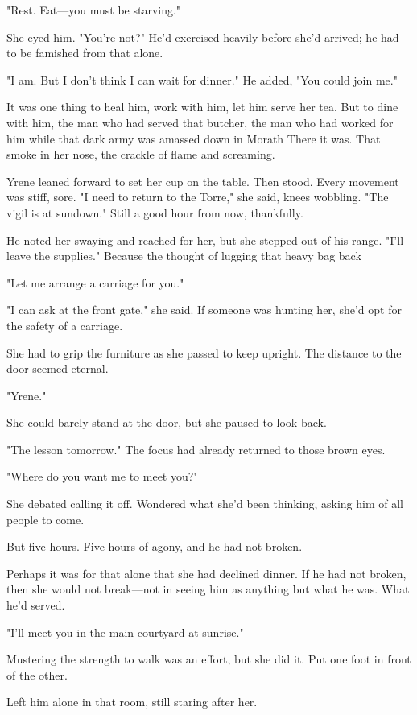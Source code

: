 "Rest. Eat---you must be starving."

She eyed him. "You're not?" He'd exercised heavily before she'd arrived; he had to be famished from that alone.

"I am. But I don't think I can wait for dinner." He added, "You could join me."

It was one thing to heal him, work with him, let him serve her tea. But to dine with him, the man who had served that butcher, the man who had worked for him while that dark army was amassed down in Morath 
There it was. That smoke in her nose, the crackle of flame and screaming.

Yrene leaned forward to set her cup on the table. Then stood. Every movement was stiff, sore. "I need to return to the Torre," she said, knees wobbling. "The vigil is at sundown." Still a good hour from now, thankfully.

He noted her swaying and reached for her, but she stepped out of his range. "I'll leave the supplies." Because the thought of lugging that heavy bag back 

"Let me arrange a carriage for you."

"I can ask at the front gate," she said. If someone was hunting her, she'd opt for the safety of a carriage.

She had to grip the furniture as she passed to keep upright. The distance to the door seemed eternal.

"Yrene."

She could barely stand at the door, but she paused to look back.

"The lesson tomorrow." The focus had already returned to those brown eyes.

"Where do you want me to meet you?"

She debated calling it off. Wondered what she'd been thinking, asking him of all people to come.

But  five hours. Five hours of agony, and he had not broken.

Perhaps it was for that alone that she had declined dinner. If he had not broken, then she would not break---not in seeing him as anything but what he was. What he'd served.

"I'll meet you in the main courtyard at sunrise."

Mustering the strength to walk was an effort, but she did it. Put one foot in front of the other.

Left him alone in that room, still staring after her.

